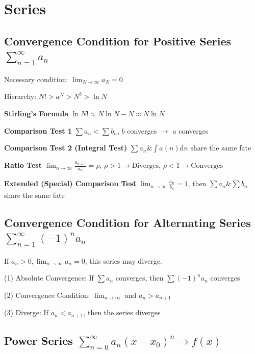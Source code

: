 \documentclass[10pt]{article}
\newcommand{\dd}{\mathrm{d}}
\begin{document}
\tableofcontents

\newpage

\section{Series}

\subsection[Convergence Condition for Positive Series]{Convergence Condition for Positive Series $\sum\limits_{n=1}^{\infty} a_n$}

Necessary condition: $\lim_{N\to \infty} a_N = 0$

Hierarchy: $N! > a^N > N^b > \ln{N}$

\textbf{Stirling's Formula} $\ln{N!} \approx N\ln{N}-N \approx N\ln{N}$

\textbf{Comparison Test 1} $\sum a_n < \sum b_n$, $b$ converges $\to$ $a$ converges

\textbf{Comparison Test 2 (Integral Test)} $\sum a_n \& \int a(n) \dd n$ share the same fate

\textbf{Ratio Test}
	$\lim_{n\to \infty} \frac{a_{n+1}}{a_n} = \rho$, $\rho > 1 \to \text{Diverges}$, $\rho < 1 \to \text{Converges}$

\textbf{Extended (Special) Comparison Test}
$\lim_{n\to \infty} \frac{a_n}{b_n} = 1$, then $\sum a_n \& \sum b_n$ share the same fate

\subsection[Convergence Condition for Alternating Series]{Convergence Condition for Alternating Series $\sum\limits_{n=1}^{\infty} (-1)^n a_n$}

If $a_n>0, \lim_{n\to\infty} a_n = 0$, this series may diverge.

(1) Absolute Convergence: If $\sum a_n$ converges, then $\sum (-1)^n a_n$ converges

(2) Convergence Condition: $\lim_{n\to\infty} \text{ and } a_n > a_{n+1}$

(3) Diverge: If $a_n < a_{n+1}$, then the series diverges

\subsection[Power Series]{Power Series $\sum_{n=0}^\infty a_n (x-x_0)^n \rightarrow f(x)$}
\end{document}
